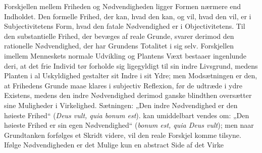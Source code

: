 \documentclass[12pt]{book}
\newcommand{\opage}[1]{\marginnote{\footnotesize\textit{[#1]}}}
\begin{document}
Forskjellen mellem Friheden og Nødvendigheden ligger Formen nærmere end Indholdet. Den
formelle Frihed, der kan, hvad den kan, og vil, hvad den vil, er i Subjectivitetens
Form, hvad den fatale Nødvendighed er i Objectivitetens. Til den substantielle Frihed,
der bevæges af reale Grunde, svarer derimod den rationelle Nødvendighed, der har
Grundens Totalitet i sig selv. Forskjellen imellem Menneskets normale Udvikling og
Plantens Væxt bestaaer ingenlunde deri, at det frie Individ tør forholde sig ligegyldigt
til sin indre Livsgrund, medens Planten i al Uskyldighed gestalter sit Indre i sit Ydre;
men Modsætningen er den, at Frihedens Grunde maae klares i subjectiv Reflexion, før de
udtræde i ydre Existens, medens den indre Nødvendighed derimod ganske blindthen
oversætter sine Muligheder i Virkelighed. Sætningen: „Den indre Nødvendighed er den
høieste Frihed“ (\textit{Deus vult, quia bonum est}). kan umiddelbart vendes om: „Den
høieste Frihed er sin egen Nødvendighed“ (\textit{bonum est, quia Deus vult}); men naar
Grundtanken forfølges et Skridt videre, vil den reale Forskjel komme tilsyne. Ifølge
Nødvendigheden er det Mulige kun en abstract Side af det Virke%
\opage{216}%
%
%
%
%
%
\end{document}
